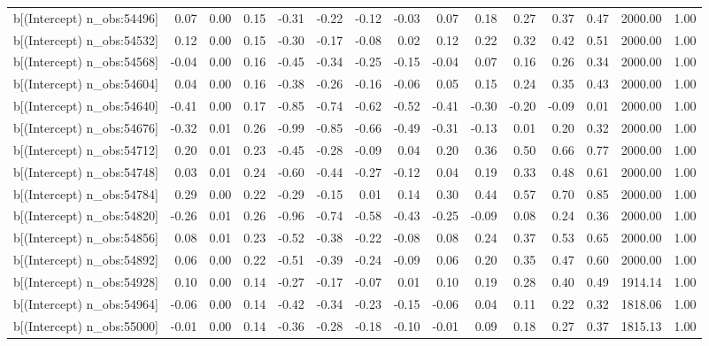\begin{table}[ht]
\begin{tabular}{rrrrrrrrrrrrrrr}
  b[(Intercept) n\_obs:54496] & 0.07 & 0.00 & 0.15 & -0.31 & -0.22 & -0.12 & -0.03 & 0.07 & 0.18 & 0.27 & 0.37 & 0.47 & 2000.00 & 1.00 \\ 
  b[(Intercept) n\_obs:54532] & 0.12 & 0.00 & 0.15 & -0.30 & -0.17 & -0.08 & 0.02 & 0.12 & 0.22 & 0.32 & 0.42 & 0.51 & 2000.00 & 1.00 \\ 
  b[(Intercept) n\_obs:54568] & -0.04 & 0.00 & 0.16 & -0.45 & -0.34 & -0.25 & -0.15 & -0.04 & 0.07 & 0.16 & 0.26 & 0.34 & 2000.00 & 1.00 \\ 
  b[(Intercept) n\_obs:54604] & 0.04 & 0.00 & 0.16 & -0.38 & -0.26 & -0.16 & -0.06 & 0.05 & 0.15 & 0.24 & 0.35 & 0.43 & 2000.00 & 1.00 \\ 
  b[(Intercept) n\_obs:54640] & -0.41 & 0.00 & 0.17 & -0.85 & -0.74 & -0.62 & -0.52 & -0.41 & -0.30 & -0.20 & -0.09 & 0.01 & 2000.00 & 1.00 \\ 
  b[(Intercept) n\_obs:54676] & -0.32 & 0.01 & 0.26 & -0.99 & -0.85 & -0.66 & -0.49 & -0.31 & -0.13 & 0.01 & 0.20 & 0.32 & 2000.00 & 1.00 \\ 
  b[(Intercept) n\_obs:54712] & 0.20 & 0.01 & 0.23 & -0.45 & -0.28 & -0.09 & 0.04 & 0.20 & 0.36 & 0.50 & 0.66 & 0.77 & 2000.00 & 1.00 \\ 
  b[(Intercept) n\_obs:54748] & 0.03 & 0.01 & 0.24 & -0.60 & -0.44 & -0.27 & -0.12 & 0.04 & 0.19 & 0.33 & 0.48 & 0.61 & 2000.00 & 1.00 \\ 
  b[(Intercept) n\_obs:54784] & 0.29 & 0.00 & 0.22 & -0.29 & -0.15 & 0.01 & 0.14 & 0.30 & 0.44 & 0.57 & 0.70 & 0.85 & 2000.00 & 1.00 \\ 
  b[(Intercept) n\_obs:54820] & -0.26 & 0.01 & 0.26 & -0.96 & -0.74 & -0.58 & -0.43 & -0.25 & -0.09 & 0.08 & 0.24 & 0.36 & 2000.00 & 1.00 \\ 
  b[(Intercept) n\_obs:54856] & 0.08 & 0.01 & 0.23 & -0.52 & -0.38 & -0.22 & -0.08 & 0.08 & 0.24 & 0.37 & 0.53 & 0.65 & 2000.00 & 1.00 \\ 
  b[(Intercept) n\_obs:54892] & 0.06 & 0.00 & 0.22 & -0.51 & -0.39 & -0.24 & -0.09 & 0.06 & 0.20 & 0.35 & 0.47 & 0.60 & 2000.00 & 1.00 \\ 
  b[(Intercept) n\_obs:54928] & 0.10 & 0.00 & 0.14 & -0.27 & -0.17 & -0.07 & 0.01 & 0.10 & 0.19 & 0.28 & 0.40 & 0.49 & 1914.14 & 1.00 \\ 
  b[(Intercept) n\_obs:54964] & -0.06 & 0.00 & 0.14 & -0.42 & -0.34 & -0.23 & -0.15 & -0.06 & 0.04 & 0.11 & 0.22 & 0.32 & 1818.06 & 1.00 \\ 
  b[(Intercept) n\_obs:55000] & -0.01 & 0.00 & 0.14 & -0.36 & -0.28 & -0.18 & -0.10 & -0.01 & 0.09 & 0.18 & 0.27 & 0.37 & 1815.13 & 1.00 \\ 

\end{tabular}
\end{table}
